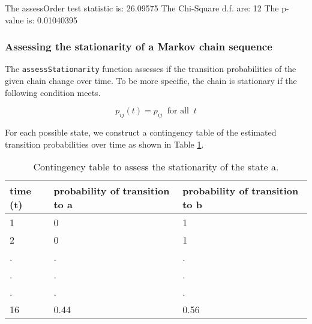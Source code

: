 \documentclass[
  nojss]{jss}
\begin{document}
\begin{CodeChunk}



\begin{CodeOutput}
The assessOrder test statistic is:  26.09575 
The Chi-Square d.f. are:  12 
The p-value is:  0.01040395 
\end{CodeOutput}
\end{CodeChunk}

\hypertarget{assessing-the-stationarity-of-a-markov-chain-sequence}{%
\subsubsection{Assessing the stationarity of a Markov chain sequence}\label{assessing-the-stationarity-of-a-markov-chain-sequence}}

The \texttt{assessStationarity} function assesses if the transition probabilities of the given chain change over time. To be more specific, the chain is stationary if the following condition meets.

\begin{equation}
p_{ij}(t) = p_{ij} ~\textrm{ for all }~t
\label{eq:stationarity}
\end{equation}

For each possible state, we construct a contingency table of the estimated transition probabilities over time as shown in Table \ref{tab:stationarity}.

\begin{table}[h]
  \centering
  \begin{tabular}{l | l | l}
    \hline
  time (t) & probability of transition to a & probability of transition to b \\
    \hline  \hline
  1 & 0 & 1\\
  2 & 0 & 1\\
  . & . & . \\
  . & . & . \\
  . & . & . \\
  16 & 0.44 & 0.56\\
  \hline
\end{tabular}
\caption{Contingency table to assess the stationarity of the state a.}
\label{tab:stationarity}
\end{table}
\end{document}
